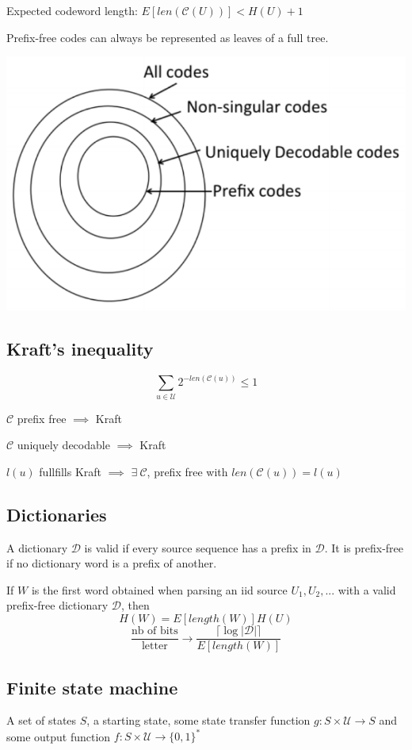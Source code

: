 \documentclass[10pt,a4paper,landscape]{article}
\newcommand{\code}{\mathcal{C}}
\newcommand{\alphabet}{\mathcal{U}}
\begin{document}
\begin{multicols*}{4}
Expected codeword length: $E[len(\code(U))] < H(U) + 1$

Prefix-free codes can always be represented as leaves of a full tree.

\begin{colfig}
	\centering
	\includegraphics[width=\linewidth]{code-classes.png}
\end{colfig}

\subsection{Kraft's inequality}
$$\sum_{u \in \alphabet} 2^{-len(\code(u))} \leq 1$$

$\code$ prefix free $\implies$ Kraft

$\code$ uniquely decodable $\implies$ Kraft

$l(u)$ fullfills Kraft $\implies$ $\exists \ \code$, prefix free with $len(\code(u)) = l(u)$

\subsection{Dictionaries}
A dictionary $\mathcal{D}$ is valid if every source sequence has a prefix in $\mathcal{D}$. It is prefix-free if no dictionary word is a prefix of another.

If $W$ is the first word obtained when parsing an iid source $U_1,U_2,...$ with a valid prefix-free dictionary $\mathcal{D}$, then $$H(W) = E[length(W)]H(U)$$
$$\frac{\text{nb of bits}}{\text{letter}} \rightarrow \frac{\lceil\log |\mathcal{D}|\rceil}{E[length(W)]}$$

\subsection{Finite state machine}
A set of states $S$, a starting state, some state transfer function $g: S \times \alphabet \rightarrow S$ and some output function $f: S \times \alphabet \rightarrow \{0,1\}^*$


\end{multicols*}
\end{document}
